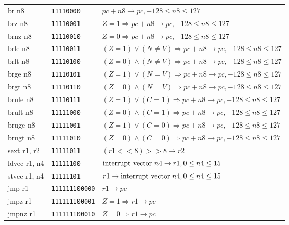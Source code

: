 \documentclass[10pt, twoside, a4paper]{article}
\newcommand{\shl}{\ensuremath{<\!\!<}}
\newcommand{\sar}{\ensuremath{>\!\!>}}
\begin{document}
{\begin{longtable}{llp{}}
  \hline
    br n8             & \texttt{11110000}     & $pc + n8 \rightarrow pc, -128 \leq n8 \leq 127$ \\
    brz n8            & \texttt{11110001}     & $Z = 1 \Rightarrow pc + n8 \rightarrow pc, -128 \leq n8 \leq 127$ \\
    brnz n8           & \texttt{11110010}     & $Z = 0 \Rightarrow pc + n8 \rightarrow pc, -128 \leq n8 \leq 127$ \\
    brle n8           & \texttt{11110011}     & $(Z = 1) \vee (N \not = V) \Rightarrow pc + n8 \rightarrow pc, -128 \leq n8 \leq 127$ \\
    brlt n8           & \texttt{11110100}     & $(Z = 0) \wedge (N \not = V) \Rightarrow pc + n8 \rightarrow pc, -128 \leq n8 \leq 127$ \\
    brge n8           & \texttt{11110101}     & $(Z = 1) \vee (N = V) \Rightarrow pc + n8 \rightarrow pc, -128 \leq n8 \leq 127$ \\
    brgt n8           & \texttt{11110110}     & $(Z = 0) \wedge (N = V) \Rightarrow pc + n8 \rightarrow pc, -128 \leq n8 \leq 127$ \\
    brule n8          & \texttt{11110111}     & $(Z = 1) \vee (C = 1) \Rightarrow pc + n8 \rightarrow pc, -128 \leq n8 \leq 127$ \\
    brult n8          & \texttt{11111000}     & $(Z = 0) \wedge (C = 1) \Rightarrow pc + n8 \rightarrow pc, -128 \leq n8 \leq 127$ \\
    bruge n8          & \texttt{11111001}     & $(Z = 1) \vee (C = 0) \Rightarrow pc + n8 \rightarrow pc, -128 \leq n8 \leq 127$ \\
    brugt n8          & \texttt{11111010}     & $(Z = 0) \wedge (C = 0) \Rightarrow pc + n8 \rightarrow pc, -128 \leq n8 \leq 127$ \\
    sext r1, r2       & \texttt{11111011}     & $(r1 \shl 8) \sar 8 \rightarrow r2$ \\
    ldvec r1, n4      & \texttt{11111100}     & $\textnormal{interrupt vector}\ n4 \rightarrow r1, 0 \leq n4 \leq 15$ \\
    stvec r1, n4      & \texttt{11111101}     & $r1 \rightarrow \textnormal{interrupt vector}\ n4, 0 \leq n4 \leq 15$ \\
  \hline
    jmp r1            & \texttt{111111100000} & $r1 \rightarrow pc$ \\
    jmpz r1           & \texttt{111111100001} & $Z = 1 \Rightarrow r1 \rightarrow pc$ \\
    jmpnz r1          & \texttt{111111100010} & $Z = 0 \Rightarrow r1 \rightarrow pc$ \\

\end{longtable}}
\end{document}
